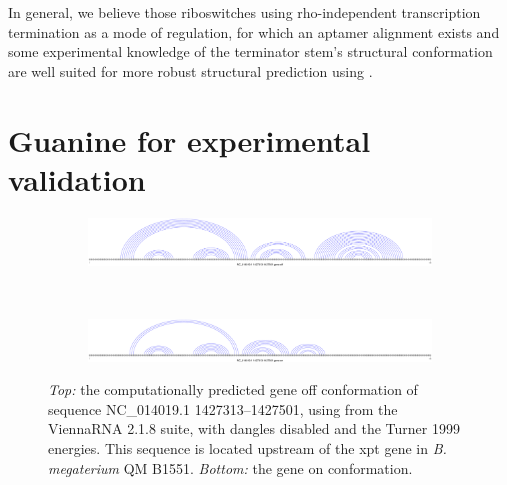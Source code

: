 In general, we believe those riboswitches using rho-independent transcription
termination as a mode of regulation, for which an aptamer alignment exists and
some experimental knowledge of the terminator stem's structural conformation are
well suited for more robust structural prediction using \rfinder.

\section{Guanine \rbs for experimental validation}
\label{sec:rfinder:grbValidationVarna}

\begin{figure}[!ht]
\centering
\begin{subfigure}[h]{\textwidth}
\centering
\includegraphics[width=.9\textwidth]{Figures/Ribofinder/NC_014019_1_1427313_1427501_OFF.pdf}
\end{subfigure} \\
\medskip
\begin{subfigure}[h]{\textwidth}
\centering
\includegraphics[width=.9\textwidth]{Figures/Ribofinder/NC_014019_1_1427313_1427501_ON.pdf}
\end{subfigure}
\caption{{\em Top:} the computationally predicted gene off conformation of
sequence NC\_014019.1 1427313--1427501, using \rfold from the ViennaRNA 2.1.8
suite, with dangles disabled and the Turner 1999 energies. This sequence is
located upstream of the xpt gene in {\em B. megaterium} QM B1551. {\em Bottom:}
the gene on conformation.}
\label{fig:figure:NC_014019_1_1427313_1427501}
\end{figure}
\medskip

